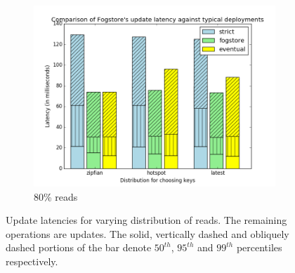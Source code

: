 \begin{figure}[t]
\begin{subfigure}[b]{0.32\linewidth}
    \includegraphics[width=\linewidth]{figures/fogstore/evals/stress-tests/0.8/update.png}
    \caption{80\% reads}
  \end{subfigure}
  \caption{Update latencies for varying distribution of reads. The remaining operations are updates. The solid, vertically dashed and obliquely dashed portions of the bar denote $50^{th}$, $95^{th}$ and $99^{th}$ percentiles respectively.}
  \label{fig:update-latencies}
\end{figure}

